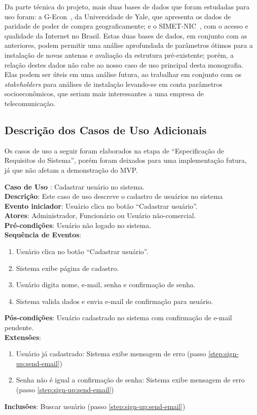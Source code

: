 \documentclass[]{politex}
\begin{document}
Da parte técnica do projeto, mais duas bases de dados que foram estudadas para
uso foram: a G-Econ~\cite{gecon}, da Universidade de Yale, que apresenta os dados de paridade de
poder de compra geograficamente; e o SIMET-NIC~\cite{simet}, com o acesso e
qualidade da Internet no Brasil. Estas duas bases de dados, em conjunto com as
anteriores, podem permitir uma análise aprofundada de parâmetros ótimos para a
instalação de novas antenas e avaliação da estrutura pré-existente; porém,
a relação destes dados não cabe ao nosso caso de uso principal desta monografia. Elas podem
ser úteis em uma análise futura, ao trabalhar em conjunto com os
\textit{stakeholders} para análises de instalação levando-se em conta parâmetros socioeconômicos,
que seriam mais interessantes a uma empresa de telecomunicação.

\subsection{Descrição dos Casos de Uso Adicionais}

Os casos de uso a seguir foram elaborados na etapa de ``Especificação de
Requisitos do Sistema'', porém foram deixados para uma implementação futura, já
que não afetam a demonstração do MVP.

\noindent \textbf{Caso de Uso }: Cadastrar usuário no sistema.  \\
\textbf{Descrição}: Este caso de uso descreve o cadastro de usuários no sistema \\
\textbf{Evento iniciador}: Usuário clica no botão ``Cadastrar usuário''. \\
\textbf{Atores}: Administrador, Funcionário ou Usuário não-comercial. \\
\textbf{Pré-condições}: Usuário não logado no sistema. \\
\textbf{Sequência de Eventos}:
\begin{enumerate}
\item Usuário clica no botão ``Cadastrar usuário''.
\item Sistema exibe página de cadastro.
\item Usuário digita nome, e-mail, senha e confirmação de senha.
\item\label{step:sign-up:send-email} Sistema valida dados e envia e-mail de confirmação para usuário.
\end{enumerate}
\textbf{Pós-condições}: Usuário cadastrado no sistema com confirmação de e-mail pendente. \\
\textbf{Extensões}:
\begin{enumerate}
\item Usuário já cadastrado: Sistema exibe mensagem de erro (passo \ref{step:sign-up:send-email})
\item Senha não é igual a confirmação de senha: Sistema exibe mensagem de erro (passo \ref{step:sign-up:send-email})
\end{enumerate}
\textbf{Inclusões}: Buscar usuário (passo \ref{step:sign-up:send-email}) \\
\end{document}
